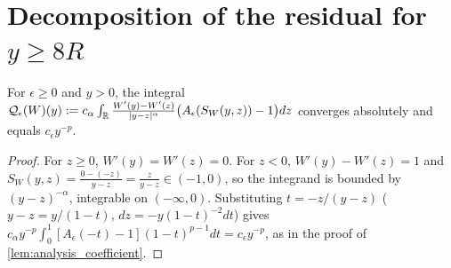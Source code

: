 \section{Decomposition of the residual for $y\ge8R$}

\begin{lemma}
  \label{lem:c04_QW}
  For $\epsilon\ge0$ and $y>0$, the integral $\mathcal{Q}_\epsilon(W)(y):=c_\alpha\int_{\mathbb{R}}\frac{W'(y)-W'(z)}{|y-z|^\alpha}\bigl(A_\epsilon(S_W(y,z))-1\bigr)dz$
  converges absolutely and equals $c_\epsilon y^{-p}$.
\end{lemma}
\begin{proof}
  For $z\ge0$, $W'(y)=W'(z)=0$. For $z<0$, $W'(y)-W'(z)=1$ and $S_W(y,z)=\frac{0-(-z)}{y-z}=\frac z{y-z}\in(-1,0)$, so the integrand is bounded by
  $(y-z)^{-\alpha}$, integrable on $(-\infty,0)$. Substituting $t=-z/(y-z)$ ($y-z=y/(1-t)$, $dz=-y(1-t)^{-2}dt$) gives
  $c_\alpha y^{-p}\int_0^1[A_\epsilon(-t)-1](1-t)^{p-1}dt=c_\epsilon y^{-p}$, as in the proof of \cref{lem:analysis_coefficient}.
\end{proof}


